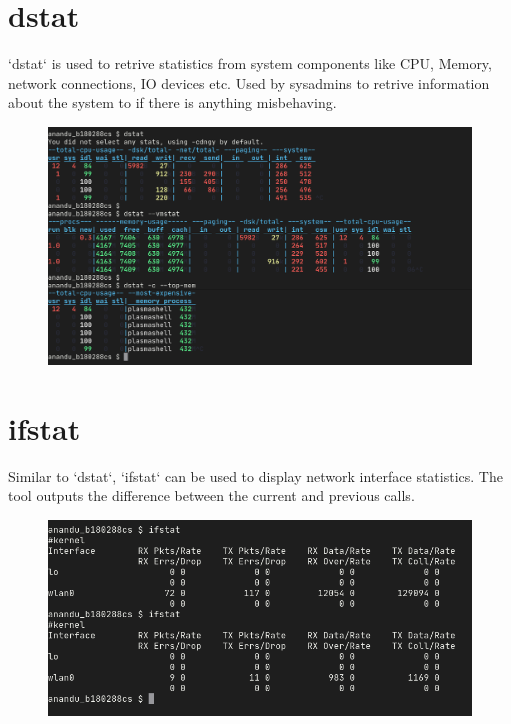 \documentclass{article}
\begin{document}
\section{dstat}
`dstat` is used to retrive statistics from system components like CPU, Memory, network connections, IO devices etc. Used by sysadmins to retrive information about the system to if there is anything misbehaving.  
\begin{figure}[ht]
    \centering
    \includegraphics[width=1.0\textwidth]{images/dstat.png}
\end{figure}
\pagebreak

\section{ifstat}
Similar to `dstat`, `ifstat` can be used to display network interface statistics. The tool outputs the difference between the current and previous calls.
\begin{figure}[ht]
    \centering
    \includegraphics[width=1.0\textwidth]{images/ifstat.png}
\end{figure}
\pagebreak
\end{document}
